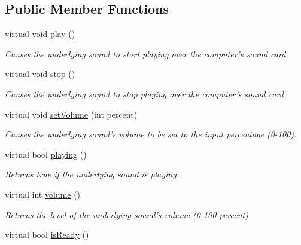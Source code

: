 \subsection*{Public Member Functions}
\begin{DoxyCompactItemize}
\item 
\hypertarget{class_picto_1_1_multiplatform_sound_a2d934e20f151f2f89fda5bde9cf290a6}{virtual void \hyperlink{class_picto_1_1_multiplatform_sound_a2d934e20f151f2f89fda5bde9cf290a6}{play} ()}\label{class_picto_1_1_multiplatform_sound_a2d934e20f151f2f89fda5bde9cf290a6}

\begin{DoxyCompactList}\small\item\em Causes the underlying sound to start playing over the computer's sound card. \end{DoxyCompactList}\item 
\hypertarget{class_picto_1_1_multiplatform_sound_a24e7c2458e188a5c31a5690eb37547b9}{virtual void \hyperlink{class_picto_1_1_multiplatform_sound_a24e7c2458e188a5c31a5690eb37547b9}{stop} ()}\label{class_picto_1_1_multiplatform_sound_a24e7c2458e188a5c31a5690eb37547b9}

\begin{DoxyCompactList}\small\item\em Causes the underlying sound to stop playing over the computer's sound card. \end{DoxyCompactList}\item 
virtual void \hyperlink{class_picto_1_1_multiplatform_sound_a45b56fa2cc55812c7bcca3c7123dfe87}{set\-Volume} (int percent)
\begin{DoxyCompactList}\small\item\em Causes the underlying sound's volume to be set to the input percentage (0-\/100). \end{DoxyCompactList}\item 
\hypertarget{class_picto_1_1_multiplatform_sound_a42cba863c919223544d35c41e55b3cba}{virtual bool \hyperlink{class_picto_1_1_multiplatform_sound_a42cba863c919223544d35c41e55b3cba}{playing} ()}\label{class_picto_1_1_multiplatform_sound_a42cba863c919223544d35c41e55b3cba}

\begin{DoxyCompactList}\small\item\em Returns true if the underlying sound is playing. \end{DoxyCompactList}\item 
virtual int \hyperlink{class_picto_1_1_multiplatform_sound_a3cc7215c0941af0aabe08df8b09a6b31}{volume} ()
\begin{DoxyCompactList}\small\item\em Returns the level of the underlying sound's volume (0-\/100 percent) \end{DoxyCompactList}\item 
\hypertarget{class_picto_1_1_multiplatform_sound_a6176c20eb4e91fc817af83b6cd8d7953}{virtual bool \hyperlink{class_picto_1_1_multiplatform_sound_a6176c20eb4e91fc817af83b6cd8d7953}{is\-Ready} ()}\label{class_picto_1_1_multiplatform_sound_a6176c20eb4e91fc817af83b6cd8d7953}


\end{DoxyCompactItemize}
